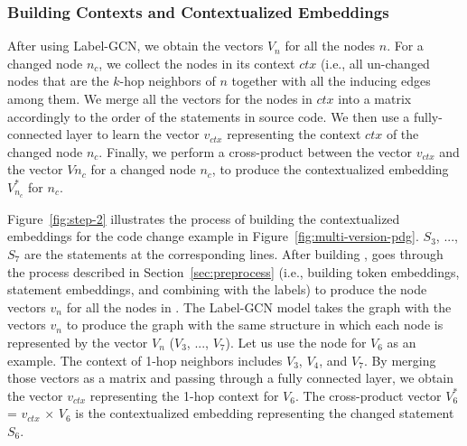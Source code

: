 \subsubsection{{\bf Building Contexts and Contextualized Embeddings}}
After using Label-GCN, we obtain the vectors $V_n$ for all the nodes
$n$. For a changed node $n_c$, we collect the nodes in its context
$ctx$ (i.e., all un-changed nodes that are the $k$-hop neighbors of $n$
together with all the inducing edges among them. We merge all the
vectors for the nodes in $ctx$ into a matrix accordingly to the order
of the statements in source code. We then use a fully-connected layer
to learn the vector $v_{ctx}$ representing the context $ctx$ of the
changed node $n_c$.
%
Finally, we perform a cross-product between the vector $v_{ctx}$ and
the vector $V{n_c}$ for a changed node $n_c$, to produce the
contextualized embedding $V^{*}_{n_c}$ for $n_c$.


Figure~\ref{fig:step-2} illustrates the process of building the
contextualized embeddings for the code change example in
Figure~\ref{fig:multi-version-pdg}. $S_3$, ..., $S_7$ are the
statements at the corresponding lines. After building {\mvpdg},
{\tool} goes through the process described in
Section~\ref{sec:preprocess} (i.e., building token embeddings,
statement embeddings, and combining with the labels) to produce the
node vectors $v_n$ for all the nodes in {\mvpdg}. The Label-GCN model
takes the graph with the vectors $v_n$ to produce the graph with the
same structure in which each node is represented by the vector $V_n$
($V_3$, ..., $V_7$). Let us use the node for $V_6$ as an example.  The
context of 1-hop neighbors includes $V_3$, $V_4$, and $V_7$. By
merging those vectors as a matrix and passing through a fully
connected layer, we obtain the vector $v_{ctx}$ representing the 1-hop
context for $V_6$. The cross-product vector  $V^{*}_6$ = $v_{ctx}$ $\times$ $V_6$
is the contextualized embedding representing the changed statement
$S_6$.



